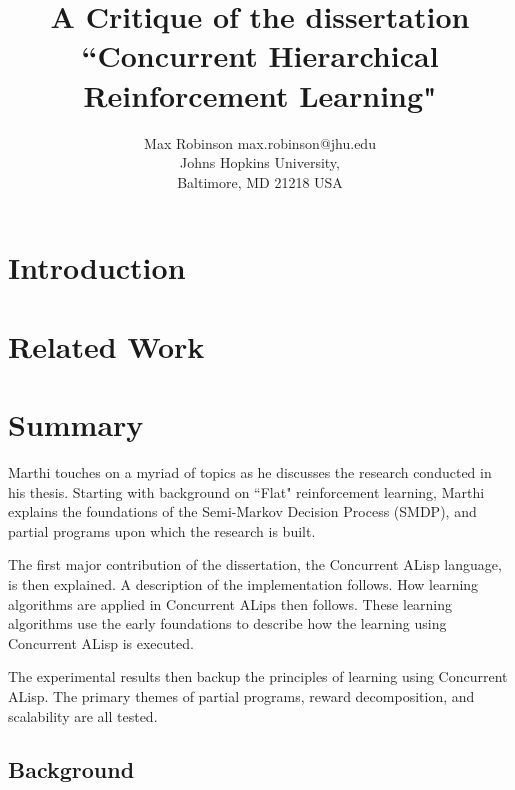 \documentclass[jair,twoside,11pt,theapa]{article}
\begin{document}
\title{A Critique of the dissertation ``Concurrent Hierarchical Reinforcement Learning"}


\author{\name Max Robinson \email max.robinson@jhu.edu \\
       \addr Johns Hopkins University,\\
       Baltimore, MD 21218 USA
   }


\maketitle


\section{Introduction}
\label{Introduction}
\cite{Marthi:2006}

\section{Related Work}
\label{Related Work}

\section{Summary}
\label{Summary}
Marthi touches on a myriad of topics as he discusses the research conducted in his thesis. Starting with background on ``Flat" reinforcement learning, Marthi explains the foundations of the Semi-Markov Decision Process (SMDP), and partial programs upon which the research is built.

The first major contribution of the dissertation, the Concurrent ALisp language, is then explained. A description of the implementation follows. How learning algorithms are applied in Concurrent ALips then follows. These learning algorithms use the early foundations to describe how the learning using Concurrent ALisp is executed.

The experimental results then backup the principles of learning using Concurrent ALisp. The primary themes of partial programs, reward decomposition, and scalability are all tested.

\subsection{Background}
\label{Background}
\end{document}
